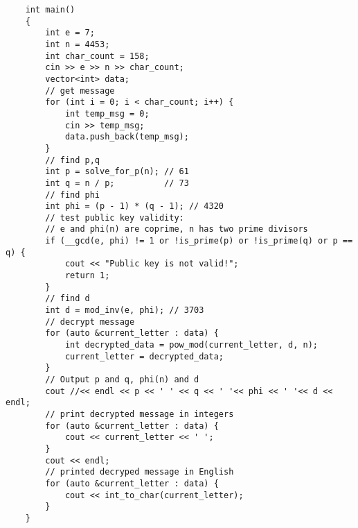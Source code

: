 \documentclass[11pt]{article}
\begin{document}
\pagebreak
\begin{verbatim}
    int main()
    {
        int e = 7;
        int n = 4453;
        int char_count = 158;
        cin >> e >> n >> char_count;
        vector<int> data;
        // get message
        for (int i = 0; i < char_count; i++) {
            int temp_msg = 0;
            cin >> temp_msg;
            data.push_back(temp_msg);
        }
        // find p,q
        int p = solve_for_p(n); // 61
        int q = n / p;          // 73
        // find phi
        int phi = (p - 1) * (q - 1); // 4320
        // test public key validity:
        // e and phi(n) are coprime, n has two prime divisors
        if (__gcd(e, phi) != 1 or !is_prime(p) or !is_prime(q) or p == q) {
            cout << "Public key is not valid!";
            return 1;
        }
        // find d
        int d = mod_inv(e, phi); // 3703
        // decrypt message
        for (auto &current_letter : data) {
            int decrypted_data = pow_mod(current_letter, d, n);
            current_letter = decrypted_data;
        }
        // Output p and q, phi(n) and d
        cout //<< endl << p << ' ' << q << ' '<< phi << ' '<< d << endl;
        // print decrypted message in integers
        for (auto &current_letter : data) {
            cout << current_letter << ' ';
        }
        cout << endl;
        // printed decryped message in English
        for (auto &current_letter : data) {
            cout << int_to_char(current_letter);
        }
    }
\end{verbatim}
\end{document}
